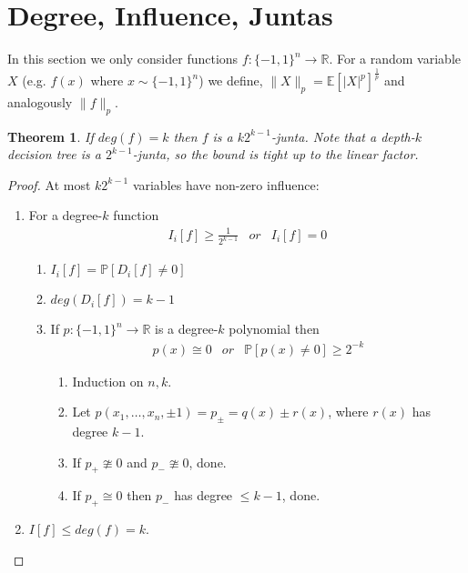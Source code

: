 \documentclass{sig-alternate}
\newtheorem{theorem}{Theorem}[section]
\begin{document}
\section{Degree, Influence, Juntas}
\noindent In this section we only consider functions $f:\{-1, 1\}^n \rightarrow \mathbb{R}$.
For a random variable $X$ (e.g. $f(x)$ where $x \sim \{-1, 1\}^n$) we define, $\|X\|_p = \mathbb{E}[|X|^p]^{\frac{1}{p}}$ and analogously $\|f\|_p$.
\begin{theorem}
If $deg(f) = k$ then $f$ is a $k2^{k-1}$-junta. Note that a depth-$k$ decision tree is a $2^{k-1}$-junta, so the bound is tight up to the linear factor.
\end{theorem}
\begin{proof}
At most $k2^{k-1}$ variables have non-zero influence:
\begin{enumerate}
\item For a degree-$k$ function \begin{eqnarray*} I_i[f] \geq \frac{1}{2^{k-1}} & or & I_i[f] = 0 \end{eqnarray*}
	\begin{enumerate}
		\item $I_i[f] = \mathbb{P}[D_i[f] \neq 0]$
		\item $deg(D_i[f]) = k - 1$ 
		\item If $p:\{-1,1\}^n \rightarrow \mathbb{R}$ is a degree-$k$ polynomial then \begin{eqnarray*} p(x) \cong 0 & or & \mathbb{P}[p(x) \neq 0] \geq 2^{-k} \end{eqnarray*}
		\begin{enumerate}
			\item Induction on $n,k$.
			\item Let $p(x_1,\ldots,x_n, \pm 1) = p_{\pm} = q(x) \pm r(x)$, where $r(x)$ has degree $k-1$.
			\item If $p_+ \ncong 0$ and $p_- \ncong 0$, done.
			\item If $p_+ \cong 0$ then $p_-$ has degree $\leq k - 1$, done.
		\end{enumerate}
	\end{enumerate}
\item $I[f] \leq deg(f) = k$. 
\end{enumerate}
\end{proof}
\end{document}
